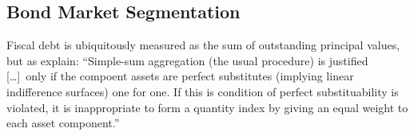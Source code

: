 \documentclass[11pt,a4paper,margin=1.5in]{article}
\begin{document}

\subsection{Bond Market Segmentation}
\label{subsec:MktSeg}
Fiscal debt is ubiquitously measured as the sum of outstanding principal values, but as \citet[pg 431]{Serletis-Robb:1986} explain: ``Simple-sum aggregation (the usual procedure) is justified [\dots]\ only if the compoent assets are perfect substitutes (implying linear indifference surfaces) one for one.
If this is condition of perfect substituability is violated, it is inappropriate to form a quantity index by giving an equal weight to each asset component.''
\end{document}
